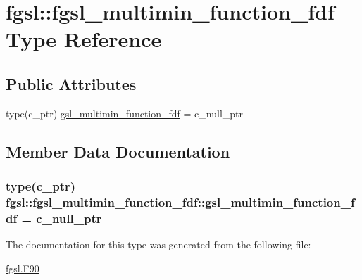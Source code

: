 \hypertarget{structfgsl_1_1fgsl__multimin__function__fdf}{}\section{fgsl\+:\+:fgsl\+\_\+multimin\+\_\+function\+\_\+fdf Type Reference}
\label{structfgsl_1_1fgsl__multimin__function__fdf}
\subsection*{Public Attributes}
\begin{DoxyCompactItemize}
\item 
type(c\+\_\+ptr) \hyperlink{structfgsl_1_1fgsl__multimin__function__fdf_a08f89b9eb3410dfac2a3d1c75b7073b1}{gsl\+\_\+multimin\+\_\+function\+\_\+fdf} = c\+\_\+null\+\_\+ptr
\end{DoxyCompactItemize}


\subsection{Member Data Documentation}
\hypertarget{structfgsl_1_1fgsl__multimin__function__fdf_a08f89b9eb3410dfac2a3d1c75b7073b1}{}
\subsubsection[{gsl\+\_\+multimin\+\_\+function\+\_\+fdf}]{\setlength{\rightskip}{0pt plus 5cm}type(c\+\_\+ptr) fgsl\+::fgsl\+\_\+multimin\+\_\+function\+\_\+fdf\+::gsl\+\_\+multimin\+\_\+function\+\_\+fdf = c\+\_\+null\+\_\+ptr}\label{structfgsl_1_1fgsl__multimin__function__fdf_a08f89b9eb3410dfac2a3d1c75b7073b1}


The documentation for this type was generated from the following file\+:\begin{DoxyCompactItemize}
\item 
\hyperlink{fgsl_8F90}{fgsl.\+F90}\end{DoxyCompactItemize}
